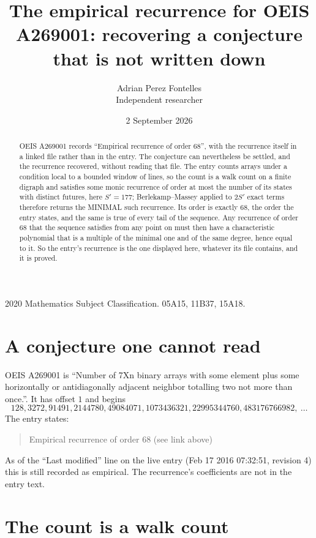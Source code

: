 \documentclass[11pt,a4paper]{article}
\title{The empirical recurrence for OEIS A269001: recovering a conjecture that is not written down}
\author{Adrian Perez Fontelles\\ \small Independent researcher}
\date{2 September 2026}
\theoremstyle{plain}
\theoremstyle{definition}
\begin{document}
\maketitle

\begin{abstract}
OEIS A269001 records ``Empirical recurrence of order $68$'', with the recurrence itself in a
linked file rather than in the entry. The conjecture can nevertheless be settled, and the
recurrence recovered, without reading that file. The entry counts arrays under a condition
local to a bounded window of lines, so the count is a walk count on a finite digraph and
satisfies some monic recurrence of order at most the number of its states with distinct
futures, here $S'=177$; Berlekamp--Massey applied to $2S'$ exact
terms therefore returns the MINIMAL such recurrence. Its order is exactly $68$, the order
the entry states, and the same is true of every tail of the sequence. Any recurrence of order
$68$ that the sequence satisfies from any point on must then have a characteristic
polynomial that is a multiple of the minimal one and of the same degree, hence equal to it. So
the entry's recurrence is the one displayed here, whatever its file contains, and it is
proved.
\end{abstract}

\noindent\small 2020 Mathematics Subject Classification. 05A15, 11B37, 15A18.\normalsize

\section{A conjecture one cannot read}

OEIS A269001 is ``Number of 7Xn binary arrays with some element plus some horizontally or antidiagonally adjacent neighbor totalling two not more than once.''. It has offset $1$ and begins
\[
128, 3272, 91491, 2144780, 49084071, 1073436321, 22995344760, 483176766982,\ \dots
\]
The entry states:
\begin{quote}
Empirical recurrence of order 68 (see link above)
\end{quote}
As of the ``Last modified'' line on the live entry (Feb 17 2016 07:32:51, revision 4) this is still
recorded as empirical. The recurrence's coefficients are not in the entry text.

\section{The count is a walk count}
\end{document}
